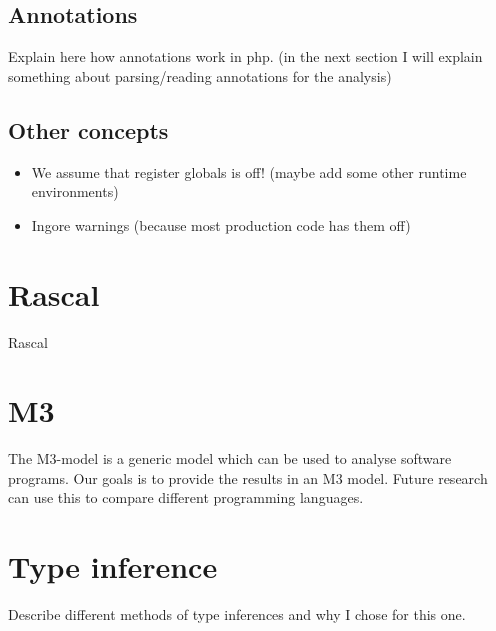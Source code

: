 \documentclass[../main.tex]{subfiles}
\begin{document}
    \subsection{Annotations}
    Explain here how annotations work in php. (in the next section I will explain something about parsing/reading annotations for the analysis)
    
    \subsection{Other concepts}
    \begin{itemize}
        \item We assume that register globals is off! (maybe add some other runtime environments)
        \item Ingore warnings (because most production code has them off)
    \end{itemize}

    
    \section{Rascal}
    \Gls{Rascal} 

    \section{M3}
    The M3-model is a generic model which can be used to analyse software programs.
    Our goals is to provide the results in an M3 model.
    Future research can use this to compare different programming languages.
    
    \section{Type inference}
    
    Describe different methods of type inferences and why I chose for this one.
    
\end{document}
